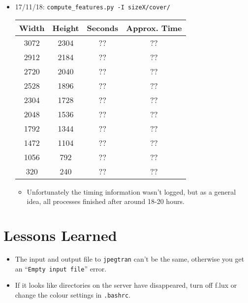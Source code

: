 \documentclass[11pt,a4paper]{report}
\begin{document}
\begin{itemize}
\item 17/11/18: \texttt{compute\_features.py -I sizeX/cover/}
  \begin{center}
  \begin{tabular}{ c c | c c }
  Width & Height & Seconds & Approx. Time \\ \hline
  3072 & 2304 & ?? & ?? \\
  2912 & 2184 & ?? & ?? \\
  2720 & 2040 & ?? & ?? \\
  2528 & 1896 & ?? & ?? \\
  2304 & 1728 & ?? & ?? \\
  2048 & 1536 & ?? & ?? \\ 
  1792 & 1344 & ?? & ?? \\
  1472 & 1104 & ?? & ?? \\
  1056 & 792 & ?? & ?? \\
  320 & 240 & ?? & ?? \\
  \end{tabular}
  \end{center}
  \begin{itemize}
  \item Unfortunately the timing information wasn't logged, but as a general idea, all processes finished after around 18-20 hours.
  \end{itemize}

\end{itemize}

\section{Lessons Learned}
\label{sec:lessons-learned}

\begin{itemize}

\item The input and output file to \texttt{jpegtran} can't be the same, otherwise you get an ``\texttt{Empty input file}'' error.

\item If it looks like directories on the server have disappeared, turn off f.lux or change the colour settings in \texttt{.bashrc}.

\end{itemize}
\end{document}
